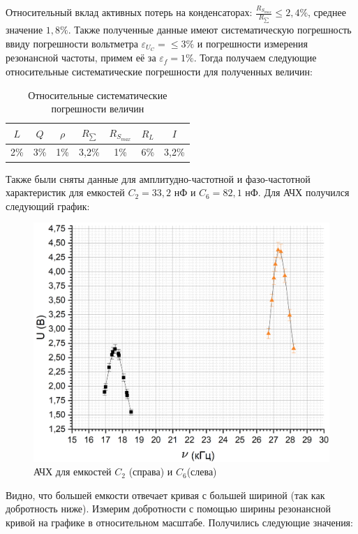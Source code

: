 \documentclass[a4paper, 12pt]{article}
\begin{document}
	Относительный вклад активных потерь на конденсаторах: $\frac{R_{S_{max}}}{R_{\sum}} \leq 2,4 \% $, среднее значение $1,8 \%$. Также полученные данные имеют систематическую погрешность ввиду погрешности вольтметра $\varepsilon_{U_C} = \leq 3\%$ и погрешности измерения резонансной частоты, примем её за $\varepsilon_f = 1 \%$. Тогда получаем следующие относительные систематические погрешности для полученных величин:
	\begin{table}[h!]
		\centering
		\begin{tabular}{|c|c|c|c|c|c|c|}
			\hline
			$L$ & $Q$ & $\rho$ & $R_{\sum}$ & $R_{S_{max}}$ & $R_L$ & $I$ \\ \hline
			2\% & 3\% & 1\% & 3,2\% & 1\% & 6\% & 3,2\% \\ \hline
		\end{tabular}
		\caption{Относительные систематические погрешности величин}
	\end{table}

	Также были сняты данные для амплитудно-частотной и фазо-частотной характеристик для емкостей $C_2 = 33,2$ нФ и $C_6 = 82,1$ нФ. Для АЧХ получился следующий график:

	\begin{figure}[h]
		\includegraphics[width = \textwidth]{2AFCH}
		\caption{АЧХ для емкостей $C_2$ (справа) и $C_6$(слева)}
	\end{figure}

	Видно, что большей емкости отвечает кривая с большей шириной (так как добротность ниже). Измерим добротности с помощью ширины резонансной кривой на графике в относительном масштабе. Получились следующие значения:
\end{document}
